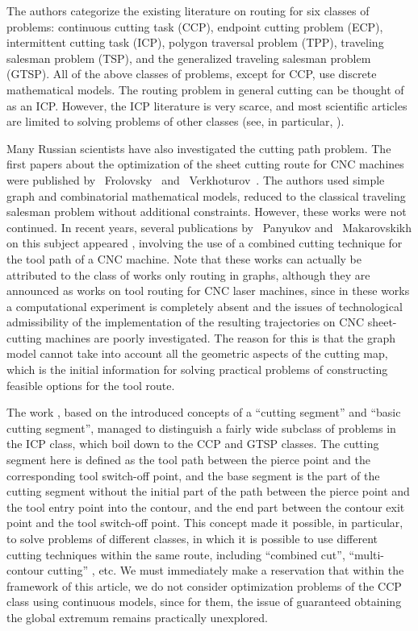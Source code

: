 The authors categorize the existing literature on routing
for six classes of problems:
continuous cutting task (CCP),
endpoint cutting problem (ECP),
intermittent cutting task (ICP),
polygon traversal problem (TPP),
traveling salesman problem (TSP),
and the generalized traveling salesman problem (GTSP).
All of the above classes of problems, except for CCP, use discrete mathematical models.
The routing problem in general cutting can be thought of as an ICP.
However, the ICP literature is very scarce,
and most scientific articles are limited to solving problems of other classes (see, in particular, \cite{bibx:301}).

Many Russian scientists have also investigated the cutting path problem. The first papers about the optimization of the sheet cutting route for CNC machines
were published by ~Frolovsky~\cite{bibx:104}
and ~Verkhoturov~\cite{bibx:105}.
The authors used simple graph and combinatorial mathematical models,
reduced to the classical traveling salesman problem without additional constraints.
However, these works were not continued.
In recent years, several publications by ~Panyukov
and ~Makarovskikh on this subject appeared
\cite{bibx:106,bibx:107,bibx:108},
involving the use of a combined cutting technique
for the tool path of a CNC machine.
Note that these works can actually be attributed to the class of works only routing in graphs, although they are announced as works on tool routing for CNC laser machines, since in these works a computational experiment is completely absent
and the issues of technological admissibility of the implementation of the resulting trajectories on CNC sheet-cutting machines are poorly investigated.
The reason for this is that the graph model
cannot take into account all the geometric aspects of the cutting map, which is the initial information for solving practical problems of constructing feasible options for the tool route.


The work \cite{bibx:308,bibx:112},
based on the introduced concepts of a ``cutting segment''
and ``basic cutting segment'',
managed to distinguish a fairly wide subclass of problems in the ICP class,
which boil down to the CCP and GTSP classes.
The cutting segment here is defined as the tool path between the pierce point and the corresponding tool switch-off point, and the base segment is the part of the cutting segment without the initial part of the path between the pierce point and the tool entry point into the contour, and the end part between the contour exit point and the tool switch-off point.
This concept made it possible, in particular,
to solve problems of different classes,
in which it is possible to use different cutting techniques within the same route,
including ``combined cut'', ``multi-contour cutting''
\cite[part I] {4}, etc.
We must immediately make a reservation that within the framework of this article, we do not consider optimization problems of the CCP class using continuous models,
since for them, the issue of guaranteed obtaining the global extremum remains practically unexplored.

